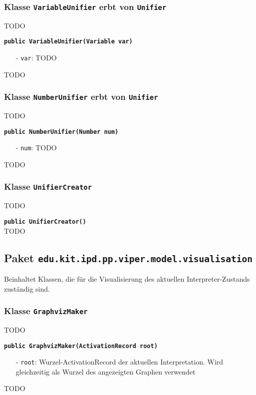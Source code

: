 \documentclass[parskip=full,11pt,twoside]{scrartcl}
\begin{document}
\subsubsection{Klasse \texttt{VariableUnifier} erbt von \texttt{Unifier}}
TODO

\textbf{\texttt{public VariableUnifier(Variable var)}}
\begin{itemize}[noitemsep]
	\item[-] \texttt{var}: TODO
\end{itemize}
TODO

\subsubsection{Klasse \texttt{NumberUnifier} erbt von \texttt{Unifier}}
TODO

\textbf{\texttt{public NumberUnifier(Number num)}}
\begin{itemize}[noitemsep]
	\item[-] \texttt{num}: TODO
\end{itemize}
TODO

\subsubsection{Klasse \texttt{UnifierCreator}}
TODO

\textbf{\texttt{public UnifierCreator()}}\\
TODO

\newpage
\subsection{Paket \texttt{edu.kit.ipd.pp.viper.model.visualisation}}

Beinhaltet Klassen, die für die Visualisierung des aktuellen Interpreter-Zustands zuständig sind.

\subsubsection{Klasse \texttt{GraphvizMaker}}

TODO

\textbf{\texttt{public GraphvizMaker(ActivationRecord root)}}
\begin{itemize}[noitemsep]
	\item[-] \texttt{root}: Wurzel-ActivationRecord der aktuellen Interpretation. Wird gleichzeitig als Wurzel des angezeigten Graphen verwendet
\end{itemize}
TODO
\end{document}

